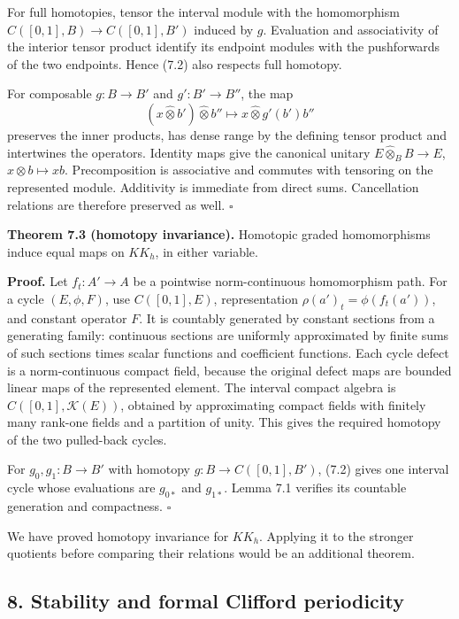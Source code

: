 \documentclass[
  11pt,
]{article}
\begin{document}
For full homotopies, tensor the interval module with the homomorphism
\(C([0,1],B)\to C([0,1],B')\) induced by \(g\). Evaluation and
associativity of the interior tensor product identify its endpoint
modules with the pushforwards of the two endpoints. Hence (7.2) also
respects full homotopy.

For composable \(g:B\to B'\) and \(g':B'\to B''\), the map \[
(x\widehat\otimes b')\widehat\otimes b''
\longmapsto x\widehat\otimes g'(b')b''
\tag{7.5}
\] preserves the inner products, has dense range by the defining tensor
product and intertwines the operators. Identity maps give the canonical
unitary \(E\widehat\otimes_B B\to E\), \(x\otimes b\mapsto xb\).
Precomposition is associative and commutes with tensoring on the
represented module. Additivity is immediate from direct sums.
Cancellation relations are therefore preserved as well. \(\square\)

\textbf{Theorem 7.3 (homotopy invariance).} Homotopic graded
homomorphisms induce equal maps on \(KK_h\), in either variable.

\textbf{Proof.} Let \(f_t:A'\to A\) be a pointwise norm-continuous
homomorphism path. For a cycle \((E,\phi,F)\), use \(C([0,1],E)\),
representation \(\rho(a')_t=\phi(f_t(a'))\), and constant operator
\(F\). It is countably generated by constant sections from a generating
family: continuous sections are uniformly approximated by finite sums of
such sections times scalar functions and coefficient functions. Each
cycle defect is a norm-continuous compact field, because the original
defect maps are bounded linear maps of the represented element. The
interval compact algebra is \(C([0,1],\mathcal K(E))\), obtained by
approximating compact fields with finitely many rank-one fields and a
partition of unity. This gives the required homotopy of the two
pulled-back cycles.

For \(g_0,g_1:B\to B'\) with homotopy \(g:B\to C([0,1],B')\), (7.2)
gives one interval cycle whose evaluations are \(g_{0*}\) and
\(g_{1*}\). Lemma 7.1 verifies its countable generation and compactness.
\(\square\)

We have proved homotopy invariance for \(KK_h\). Applying it to the
stronger quotients before comparing their relations would be an
additional theorem.

\subsection{8. Stability and formal Clifford
periodicity}\label{stability-and-formal-clifford-periodicity}
\end{document}
